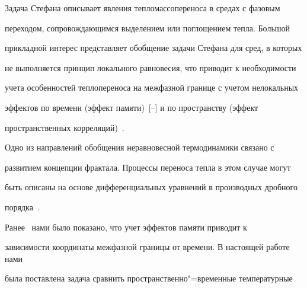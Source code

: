 


 Задача Стефана описывает явления тепломассопереноса в средах с фазовым 

переходом, сопровождающимся выделением или поглощением тепла. Большой 

прикладной интерес представляет обобщение задачи Стефана для сред, в которых 

не выполняется принцип локального равновесия, что приводит к необходимости 

учета особенностей теплопереноса на межфазной границе с учетом нелокальных 

эффектов по времени (эффект памяти)~[--] и по пространству (эффект 

пространственных корреляций)~\cite{beib:bib3,beib:bib4}. 



Одно из направлений обобщения неравновесной термодинамики связано с 

развитием концепции фрактала. Процессы переноса тепла в этом случае могут 

быть описаны на основе дифференциальных уравнений в производных дробного 

порядка~\cite{beib:bib5,beib:bib6}. 



Ранее~\cite{beib:bib3} нами было показано, что учет эффектов памяти приводит к 

зависимости координаты межфазной границы от времени. В настоящей работе нами 

была поставлена задача сравнить пространственно"=временные температурные 

